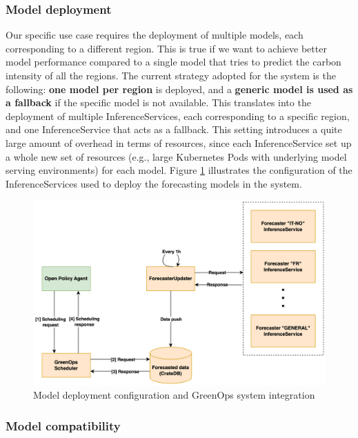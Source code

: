 \subsubsection{Model deployment}
\label{sec:model_deployment}

Our specific use case requires the deployment of multiple models, each corresponding to a different region.
This is true if we want to achieve better model performance compared to a single model that tries to predict the carbon intensity of all the regions.
The current strategy adopted for the system is the following: \textbf{one model per region} is deployed, and a \textbf{generic model is used as a fallback} if the specific model is not available.
This translates into the deployment of multiple InferenceServices, each corresponding to a specific region, and one InferenceService that acts as a fallback.
This setting introduces a quite large amount of overhead in terms of resources, since each InferenceService set up a whole new set of resources (e.g., large Kubernetes Pods with underlying model serving environments) for each model.
Figure \ref{fig:forecaster} illustrates the configuration of the InferenceServices used to deploy the forecasting models in the system.

\begin{figure}[htb]
  \centering
  \includegraphics[width=1\linewidth]{images/forecaster.png}
  \caption{Model deployment configuration and GreenOps system integration}
  \label{fig:forecaster}
\end{figure}

\subsubsection{Model compatibility}

